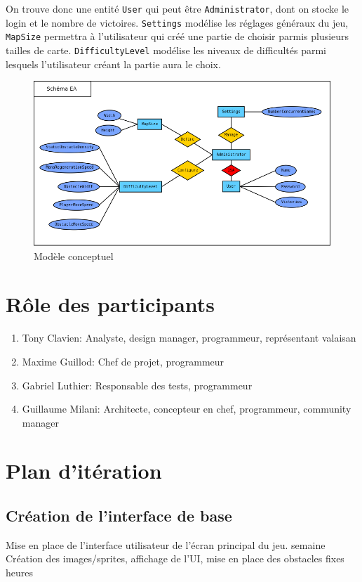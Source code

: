 \documentclass[a4paper,11pt]{article}
\begin{document}
	On trouve donc une entité \texttt{User} qui peut être \texttt{Administrator}, dont on stocke le login et le nombre de victoires. \texttt{Settings} modélise les réglages généraux du jeu, \texttt{MapSize} permettra à l'utilisateur qui créé une partie de choisir parmis plusieurs tailles de carte. \texttt{DifficultyLevel} modélise les niveaux de difficultés parmi lesquels l'utilisateur créant la partie aura le choix.
	\begin{figure}[ht]
		\centering
		\includegraphics[width=\textwidth]{../Database/ER_diagram.png}
		\caption{Modèle conceptuel}
		\label{database_er}
	\end{figure}

	\section{Rôle des participants}
		\begin{enumerate}
			\item Tony Clavien: Analyste, design manager, programmeur, représentant valaisan
			\item Maxime Guillod: Chef de projet, programmeur
			\item Gabriel Luthier: Responsable des tests, programmeur
			\item Guillaume Milani: Architecte, concepteur en chef, programmeur, community manager
		\end{enumerate}

	\newpage
	\section{Plan d'itération}
	
		\subsection{Création de l'interface de base}
			\begin{enumerate}[labelwidth=5em,leftmargin=8em]
				\objectif Mise en place de l'interface utilisateur de l'écran principal du jeu.
				 semaine
				\partageTache Création des images/sprites, affichage de l'UI, mise en place des obstacles fixes
				 heures
			\end{enumerate}
\end{document}
